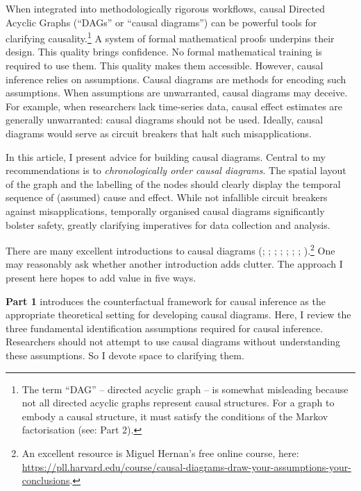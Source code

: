 \documentclass[
  singlecolumn]{article}
\begin{document}
When integrated into methodologically rigorous workflows, causal
Directed Acyclic Graphs (``DAGs'' or ``causal diagrams'') can be
powerful tools for clarifying causality.\footnote{The term ``DAG'' --
  directed acyclic graph -- is somewhat misleading because not all
  directed acyclic graphs represent causal structures. For a graph to
  embody a causal structure, it must satisfy the conditions of the
  Markov factorisation (see: Part 2).} A system of formal mathematical
proofs underpins their design. This quality brings confidence. No formal
mathematical training is required to use them. This quality makes them
accessible. However, causal inference relies on assumptions. Causal
diagrams are methods for encoding such assumptions. When assumptions are
unwarranted, causal diagrams may deceive. For example, when researchers
lack time-series data, causal effect estimates are generally
unwarranted: causal diagrams should not be used. Ideally, causal
diagrams would serve as circuit breakers that halt such misapplications.

In this article, I present advice for building causal diagrams. Central
to my recommendations is to \emph{chronologically order causal
diagrams}. The spatial layout of the graph and the labelling of the
nodes should clearly display the temporal sequence of (assumed) cause
and effect. While not infallible circuit breakers against
misapplications, temporally organised causal diagrams significantly
bolster safety, greatly clarifying imperatives for data collection and
analysis.

There are many excellent introductions to causal diagrams
(;
;
;
;
;
; ; ).\footnote{An
  excellent resource is Miguel Hernan's free online course, here:
  \url{https://pll.harvard.edu/course/causal-diagrams-draw-your-assumptions-your-conclusions}.}
One may reasonably ask whether another introduction adds clutter. The
approach I present here hopes to add value in five ways.

\textbf{Part 1} introduces the counterfactual framework for causal
inference as the appropriate theoretical setting for developing causal
diagrams. Here, I review the three fundamental identification
assumptions required for causal inference. Researchers should not
attempt to use causal diagrams without understanding these assumptions.
So I devote space to clarifying them.
\end{document}
